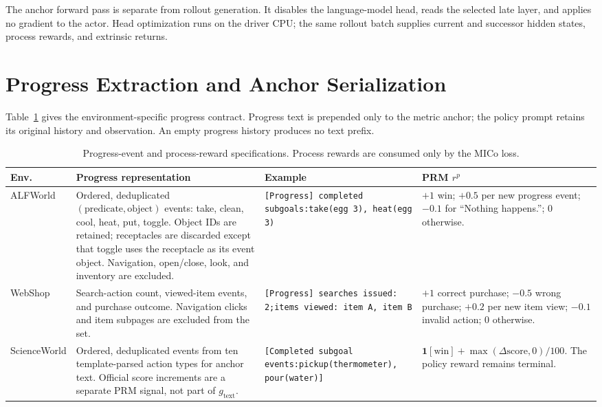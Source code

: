 The anchor forward pass is separate from rollout generation. It disables the language-model head, reads the selected late layer, and applies no gradient to the actor. Head optimization runs on the driver CPU; the same rollout batch supplies current and successor hidden states, process rewards, and extrinsic returns.

\section{Progress Extraction and Anchor Serialization}
\label{app:progress}

Table~\ref{tab:progress_rules} gives the environment-specific progress contract. Progress text is prepended only to the metric anchor; the policy prompt retains its original history and observation. An empty progress history produces no text prefix.

\begin{table}[h]
\centering
\caption{Progress-event and process-reward specifications. Process rewards are consumed only by the MICo loss.}
\label{tab:progress_rules}
\scriptsize
\setlength{\tabcolsep}{3.5pt}
\begin{tabular}{@{}p{1.65cm}p{4.95cm}p{4.65cm}p{4.35cm}@{}}
\toprule
Env. & Progress representation & Example & PRM $r^p$ \\
\midrule
ALFWorld & Ordered, deduplicated $(\mathrm{predicate},\mathrm{object})$ events: take, clean, cool, heat, put, toggle. Object IDs are retained; receptacles are discarded except that toggle uses the receptacle as its event object. Navigation, open/close, look, and inventory are excluded. &
\texttt{[Progress] completed subgoals:\newline take(egg 3), heat(egg 3)} &
$+1$ win; $+0.5$ per new progress event; $-0.1$ for ``Nothing happens.''; $0$ otherwise. \\
\addlinespace
WebShop & Search-action count, viewed-item events, and purchase outcome. Navigation clicks and item subpages are excluded from the set. &
\texttt{[Progress] searches issued: 2;\newline items viewed: item A, item B} &
$+1$ correct purchase; $-0.5$ wrong purchase; $+0.2$ per new item view; $-0.1$ invalid action; $0$ otherwise. \\
\addlinespace
ScienceWorld & Ordered, deduplicated events from ten template-parsed action types for anchor text. Official score increments are a separate PRM signal, not part of $g_{\mathrm{text}}$. &
\texttt{[Completed subgoal events:\newline pickup(thermometer), pour(water)]} &
$\mathbf 1[\mathrm{win}]+\max(\Delta\mathrm{score},0)/100$. The policy reward remains terminal. \\
\bottomrule
\end{tabular}
\end{table}

